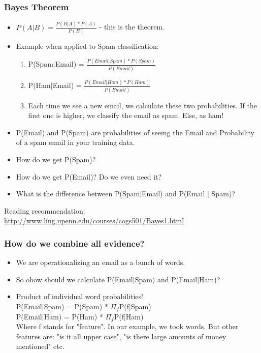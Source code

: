 \documentclass{beamer}
\begin{document}
\begin{frame}
\frametitle{Bayes Theorem}
\begin{itemize}
\item $P(A | B) =\frac{P(B |A)* P(A)} {P(B)}$ - this is the theorem.
\item Example when applied to Spam classification: 
\begin{enumerate}
\item P(Spam$|$Email) = $\frac{P(Email|Spam)*P(Spam)}{P(Email)}$
\item P(Ham$|$Email) = $\frac{P(Email|Ham)*P(Ham)}{P(Email)}$
\item Each time we see a new email, we calculate these two probabilities. If the first one is higher, we classify the email as spam. Else, as ham!
\end{enumerate}
\item P(Email) and P(Spam) are probabilities of seeing the Email and Probability of a spam email in your training data.
\item How do we get P(Spam)? \pause
\item How do we get P(Email)? \pause Do we even need it? \pause
\item What is the difference between P(Spam$|$Email) and P(Email $|$ Spam)? \pause
\end{itemize}
Reading recommendation: \url{http://www.ling.upenn.edu/courses/cogs501/Bayes1.html}
\end{frame}

\begin{frame}
\frametitle{How do we combine all evidence?}
\begin{itemize}
\item We are operationalizing an email as a bunch of words.
\item So ohow should we calculate P(Email$|$Spam) and P(Email$|$Ham)? \pause
\item Product of individual word probabilities! 
\\ P(Email$|$Spam) = P(Spam) * $\Pi_f$P(f$|$Spam) 
\\ P(Email$|$Ham) = P(Ham) * $\Pi_f$P(f$|$Ham)
\\ Where f stands for "feature". In our example, we took words. But other features are: "is it all upper case", "is there large amounts of money mentioned" etc.  
\end{itemize}
\end{frame}
\end{document}
